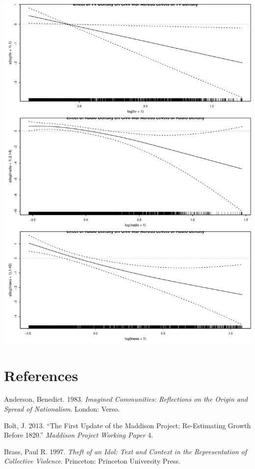 \documentclass[11pt,article,oneside]{memoir}
\makeatletter
\def\maxwidth{\ifdim\Gin@nat@width>\linewidth\linewidth
\else\Gin@nat@width\fi}
\let\Oldincludegraphics\includegraphics
\renewcommand{\includegraphics}[1]{\Oldincludegraphics[width=\maxwidth]{#1}}
\makeatother
\begin{document}
\includegraphics{./media_civil_war_files/figure-markdown/disaggregated-nonlinear.pdf}
\pagebreak   

\section{References}\label{references}

\setlength{\parindent}{-0.2in} \setlength{\leftskip}{0.2in}
\setlength{\parskip}{8pt} \vspace*{-0.2in} \noindent

Anderson, Benedict. 1983. \emph{Imagined Communities: Reflections on the
Origin and Spread of Nationalism}. London: Verso.

Bolt, J. 2013. ``The First Update of the Maddison Project; Re-Estimating
Growth Before 1820.'' \emph{Maddison Project Working Paper} 4.

Brass, Paul R. 1997. \emph{Theft of an Idol: Text and Context in the
Representation of Collective Violence}. Princeton: Princeton University
Press.
\end{document}
